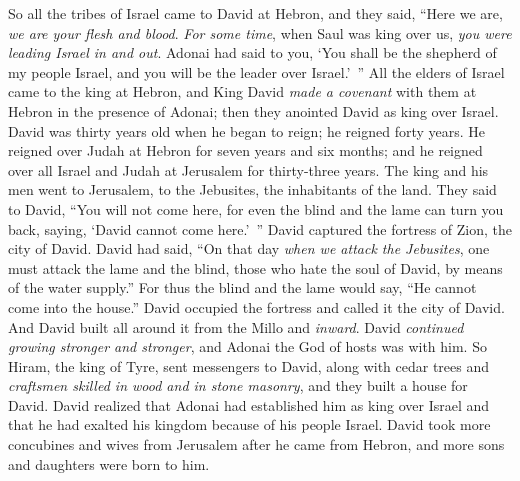 \begin{biblechapter} %
 So all the tribes of Israel came to David at Hebron, and they said, “Here we are, \textit{we are your flesh and blood}.
\verse \textit{For some time}, when Saul was king over us, \textit{you were leading Israel in and out}. Adonai had said to you, ‘You shall be the shepherd of my people Israel, and you will be the leader over Israel.’ ”
\verse All the elders of Israel came to the king at Hebron, and King David \textit{made a covenant} with them at Hebron in the presence of Adonai; then they anointed David as king over Israel.
\verse David was thirty years old when he began to reign; he reigned forty years.
\verse He reigned over Judah at Hebron for seven years and six months; and he reigned over all Israel and Judah at Jerusalem for thirty-three years.
 The king and his men went to Jerusalem, to the Jebusites, the inhabitants of the land. They said to David, “You will not come here, for even the blind and the lame can turn you back, saying, ‘David cannot come here.’ ”
\verse David captured the fortress of Zion, the city of David.
\verse David had said, “On that day \textit{when we attack the Jebusites}, one must attack the lame and the blind, those who hate the soul of David, by means of the water supply.” For thus the blind and the lame would say, “He cannot come into the house.”
\verse David occupied the fortress and called it the city of David. And David built all around it from the Millo and \textit{inward}.
\verse David \textit{continued growing stronger and stronger}, and Adonai the God of hosts was with him.
\verse So Hiram, the king of Tyre, sent messengers to David, along with cedar trees and \textit{craftsmen skilled in wood and in stone masonry}, and they built a house for David.
\verse David realized that Adonai had established him as king over Israel and that he had exalted his kingdom because of his people Israel.
\verse David took more concubines and wives from Jerusalem after he came from Hebron, and more sons and daughters were born to him.

\end{biblechapter}
